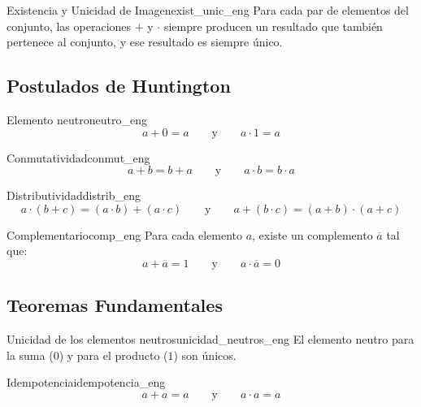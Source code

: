 \documentclass[12pt,a4paper]{article}
\begin{document}
\setcounter{tcb@cnt@preaxioma}{4}
\begin{preaxioma}{Existencia y Unicidad de Imagen}{exist_unic_eng}
Para cada par de elementos del conjunto, las operaciones $+$ y $\cdot$ siempre producen un resultado que también pertenece al conjunto, y ese resultado es siempre único.
\end{preaxioma}

\subsection*{Postulados de Huntington}

\setcounter{tcb@cnt@postulado}{0}
\begin{postulado}{Elemento neutro}{neutro_eng}
\[ a + 0 = a \qquad \text{y} \qquad a \cdot 1 = a \]
\end{postulado}

\setcounter{tcb@cnt@postulado}{2}
\begin{postulado}{Conmutatividad}{conmut_eng}
\[ a + b = b + a \qquad \text{y} \qquad a \cdot b = b \cdot a \]
\end{postulado}

\setcounter{tcb@cnt@postulado}{4}
\begin{postulado}{Distributividad}{distrib_eng}
\[ a \cdot (b + c) = (a \cdot b) + (a \cdot c) \qquad \text{y} \qquad a + (b \cdot c) = (a + b) \cdot (a + c) \]
\end{postulado}

\setcounter{tcb@cnt@postulado}{6}
\begin{postulado}{Complementario}{comp_eng}
Para cada elemento $a$, existe un complemento $\overline{a}$ tal que:
\[ a + \overline{a} = 1 \qquad \text{y} \qquad a \cdot \overline{a} = 0 \]
\end{postulado}

\subsection*{Teoremas Fundamentales}

\setcounter{tcb@cnt@teorema}{0}
\begin{teorema}{Unicidad de los elementos neutros}{unicidad_neutros_eng}
El elemento neutro para la suma ($0$) y para el producto ($1$) son únicos.
\end{teorema}

\setcounter{tcb@cnt@teorema}{1}
\begin{teorema}{Idempotencia}{idempotencia_eng}
\[ a + a = a \qquad \text{y} \qquad a \cdot a = a \]
\end{teorema}
\end{document}
